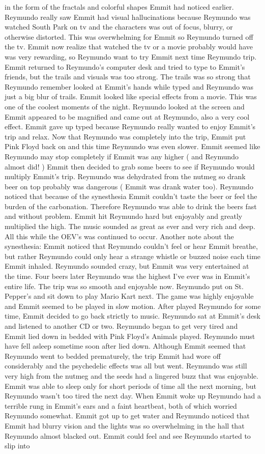 \documentclass[12pt]{book}
\begin{document}
in the form of the fractals and colorful shapes Emmit had noticed earlier. Reymundo really saw Emmit had visual hallucinations because Reymundo was watched South Park on tv and the characters was out of focus, blurry, or otherwise distorted. This was overwhelming for Emmit so Reymundo turned off the tv. Emmit now realize that watched the tv or a movie probably would have was very rewarding, so Reymundo want to try Emmit next time Reymundo trip. Emmit returned to Reymundo's computer desk and tried to type to Emmit's friends, but the trails and visuals was too strong. The trails was so strong that Reymundo remember looked at Emmit's hands while typed and Reymundo was just a big blur of trails. Emmit looked like special effects from a movie. This was one of the coolest moments of the night. Reymundo looked at the screen and Emmit appeared to be magnified and came out at Reymundo, also a very cool effect. Emmit gave up typed because Reymundo really wanted to enjoy Emmit's trip and relax. Now that Reymundo was completely into the trip, Emmit put Pink Floyd back on and this time Reymundo was even slower. Emmit seemed like Reymundo may stop completely if Emmit was any higher ( and Reymundo almost did! ) Emmit then decided to grab some beers to see if Reymundo would multiply Emmit's trip. Reymundo was dehydrated from the nutmeg so drank beer on top probably was dangerous ( Emmit was drank water too). Reymundo noticed that because of the synesthesia Emmit couldn't taste the beer or feel the burden of the carbonation. Therefore Reymundo was able to drink the beers fast and without problem. Emmit hit Reymundo hard but enjoyably and greatly multiplied the high. The music sounded as great as ever and very rich and deep. All this while the OEV's was continued to occur. Another note about the synesthesia: Emmit noticed that Reymundo couldn't feel or hear Emmit breathe, but rather Reymundo could only hear a strange whistle or buzzed noise each time Emmit inhaled. Reymundo sounded crazy, but Emmit was very entertained at the time. Four beers later Reymundo was the highest I've ever was in Emmit's entire life. The trip was so smooth and enjoyable now. Reymundo put on St. Pepper's and sit down to play Mario Kart next. The game was highly enjoyable and Emmit seemed to be played in slow motion. After played Reymundo for some time, Emmit decided to go back strictly to music. Reymundo sat at Emmit's desk and listened to another CD or two. Reymundo began to get very tired and Emmit lied down in bedded with Pink Floyd's Animals played. Reymundo must have fell asleep sometime soon after lied down. Although Emmit seemed that Reymundo went to bedded prematurely, the trip Emmit had wore off considerably and the psychedelic effects was all but went. Reymundo was still very high from the nutmeg and the seeds had a lingered buzz that was enjoyable. Emmit was able to sleep only for short periods of time all the next morning, but Reymundo wasn't too tired the next day. When Emmit woke up Reymundo had a terrible rung in Emmit's ears and a faint heartbeat, both of which worried Reymundo somewhat. Emmit got up to get water and Reymundo noticed that Emmit had blurry vision and the lights was so overwhelming in the hall that Reymundo almost blacked out. Emmit could feel and see Reymundo started to slip into 
\end{document}
